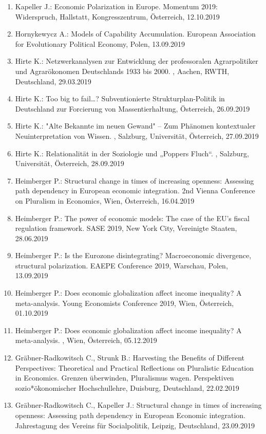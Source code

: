 \begin{enumerate}
	\item Kapeller J.: Economic Polarization in Europe. Momentum 2019: Widerspruch, Hallstatt, Kongresszentrum, Österreich, 12.10.2019
	\item Hornykewycz A.: Models of Capability Accumulation. European Association for Evolutionary Political Economy, Polen, 13.09.2019
	\item Hirte K.: Netzwerkanalysen zur Entwicklung der professoralen Agrarpolitiker und Agrarökonomen Deutschlands 1933 bis 2000. , Aachen, RWTH, Deutschland, 29.03.2019
	\item Hirte K.: Too big to fail…? Subventionierte Strukturplan-Politik in Deutschland zur Forcierung von Massentierhaltung, Österreich, 26.09.2019
	\item Hirte K.: "Alte Bekannte im neuen Gewand" – Zum Phänomen kontextualer Neuinterpretation von Wissen. , Salzburg, Universität, Österreich, 27.09.2019
	\item Hirte K.: Relationalität in der Soziologie und „Poppers Fluch“. , Salzburg, Universität, Österreich, 28.09.2019
	\item Heimberger P.: Structural change in times of increasing openness: Assessing path dependency in European economic integration. 2nd Vienna Conference on Pluralism in Economics, Wien, Österreich, 16.04.2019
	\item Heimberger P.: The power of economic models: The case of the EU's fiscal regulation framework. SASE 2019, New York City, Vereinigte Staaten, 28.06.2019
	\item Heimberger P.: Is the Eurozone disintegrating? Macroeconomic divergence, structural polarization. EAEPE Conference 2019, Warschau, Polen, 13.09.2019
	\item Heimberger P.: Does economic globalization affect income inequality? A meta-analysis. Young Economists Conference 2019, Wien, Österreich, 01.10.2019
	\item Heimberger P.: Does economic globalization affect income inequality? A meta-analysis. , Wien, Österreich, 05.12.2019
	\item Gräbner-Radkowitsch C., Strunk B.: Harvesting the Benefits of Different Perspectives: Theoretical and Practical Reflections on Pluralistic Education in Economics. Grenzen überwinden, Pluralismus wagen. Perspektiven sozio*ökonomischer Hochschullehre, Duisburg, Deutschland, 22.02.2019
	\item Gräbner-Radkowitsch C., Kapeller J.: Structural change in times of increasing openness: Assessing path dependency in European Economic integration. Jahrestagung des Vereins für Socialpolitik, Leipzig, Deutschland, 23.09.2019

\end{enumerate}
